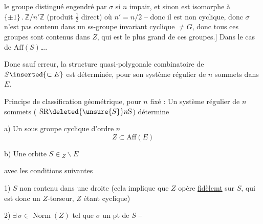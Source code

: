 le groupe distingué  engendré par $\sigma$    si $n$ impair, et sinon    est isomorphe à $\{\pm1\}\mathbin{.}\mathbb Z/n'\mathbb Z$ (produit $\frac12$ direct) où $n'=n/2$ -- donc il est non cyclique, donc $\sigma$ n'est pas contenu dans un ss-groupe invariant cyclique $\neq G$, donc tous ces groupes sont contenus dans $Z$, qui est  le plus grand de ces groupes.] Dans le cas de $\mathrm{Aff}(S)$\ldots.

Donc sauf erreur, la structure quasi-polygonale combinatoire de $S\inserted{\subset E}$ est  déterminée, pour son système régulier de $n$ sommets dans $E$.

Principe de classification géométrique, pour $n$ fixé : Un système régulier de $n$ sommets ( $\mathrm{SR}\deleted{\unsure{S}}n\mathrm S$) détermine

a) Un sous groupe cyclique d'ordre $n$
\[
Z\subset\mathrm{Aff}(E)
\]

b) Une orbite $\displaystyle S\in {}_Z\!\backslash E$

avec les conditions suivantes

1) $S$ non contenu dans une droite (cela implique que $Z$ opère \uline{fidèlemt} sur $S$, qui est donc un $Z$-torseur, $Z$ étant cyclique)

2) $\exists\,\sigma\in\operatorname{Norm}(Z)$  tel que $\sigma$   un pt de $S$ --
